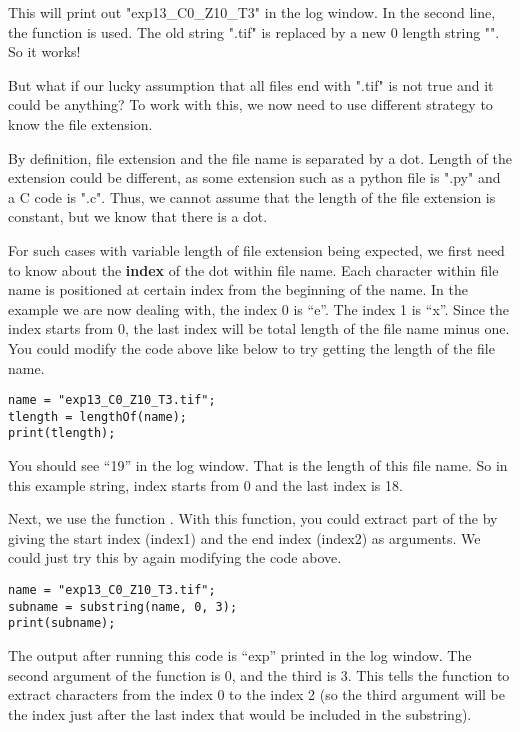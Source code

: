 This will print out "exp13\_C0\_Z10\_T3" in the log window. In the second line, the function  is used. The old string ".tif" is replaced by a new 0 length string "". So it works! 

But what if our lucky assumption that all files end with ".tif" is not true and it could be anything? To work with this, we now need to use different strategy to know the file extension. 

By definition, file extension and the file name is separated by a dot. Length of the extension could be different, as some extension such as a python file is ".py" and a C code is ".c". Thus, we cannot assume that the length of the file extension is constant, but we know that there is a dot. 

For such cases with variable length of file extension being expected, we first need to know about the \textbf{index} of the dot within file name. Each character within file name is positioned at certain index from the beginning of the name. In the example we are now dealing with, the index 0 is ``e''. The index 1 is ``x''. Since the index starts from 0, the last index will be total length of the file name minus one. You could modify the code above like below to try getting the length of the file name. 

\begin{lstlisting}
name = "exp13_C0_Z10_T3.tif";
tlength = lengthOf(name);
print(tlength);
\end{lstlisting}

You should see ``19'' in the log window. That is the length of this file name. So in this example string, index starts from 0 and the last index is 18. 

Next, we use the function . With this function, you could extract part of the  by giving the start index (index1) and the end index (index2) as arguments. We could just try this by again modifying the code above. 

\begin{lstlisting}
name = "exp13_C0_Z10_T3.tif";
subname = substring(name, 0, 3);
print(subname);
\end{lstlisting}

The output after running this code is ``exp'' printed in the log window. The second argument of the function  is 0, and the third is 3. This tells the function  to extract characters from the index 0 to the index 2 (so the third argument will be the index just after the last index that would be included in the substring). 

